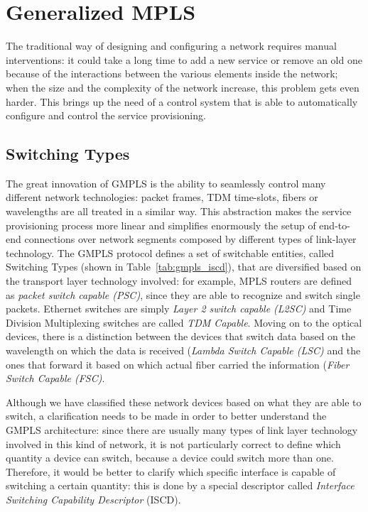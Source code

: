 \documentclass[10pt,a4paper]{report}
\begin{document}
\section{Generalized MPLS}

The traditional way of designing and configuring a network requires
manual interventions: it could take a long time to add a new service
or remove an old one because of the interactions between the various
elements inside the network; when the size and the complexity of the
network increase, this problem gets even harder. This brings up the
need of a control system that is able to automatically configure and
control the service provisioning.

\subsection{Switching Types}

The great innovation of GMPLS is the ability to seamlessly control
many different network technologies: packet frames, TDM time-slots,
fibers or wavelengths are all treated in a similar way. This
abstraction makes the service provisioning process more linear and
simplifies enormously the setup of end-to-end connections over network
segments composed by different types of link-layer technology. The
GMPLS protocol defines a set of switchable entities, called Switching
Types (shown in Table~\ref{tab:gmpls_iscd}), that are diversified
based on the transport layer technology involved: for example, MPLS
routers are defined as \textit{packet switch capable (PSC)}, since
they are able to recognize and switch single packets. Ethernet
switches are simply \textit{Layer 2 switch capable (L2SC)} and Time
Division Multiplexing switches are called \textit{TDM Capable}. Moving
on to the optical devices, there is a distinction between the devices
that switch data based on the wavelength on which the data is received
(\textit{Lambda Switch Capable (LSC)} and the ones that forward it
based on which actual fiber carried the information (\textit{Fiber
  Switch Capable (FSC)}.

Although we have classified these network devices based on what they
are able to switch, a clarification needs to be made in order to
better understand the GMPLS architecture: since there are usually many
types of link layer technology involved in this kind of network, it is
not particularly correct to define which quantity a device can switch,
because a device could switch more than one. Therefore, it would be
better to clarify which specific interface is capable of switching a
certain quantity: this is done by a special descriptor called
\textit{Interface Switching Capability Descriptor} (ISCD).
\end{document}
